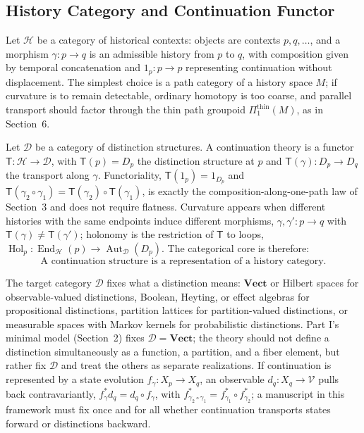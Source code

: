 \documentclass[11pt]{article}
\newcommand{\Hol}{\operatorname{Hol}}
\begin{document}
\subsection{History Category and Continuation Functor}

Let $\mathcal{H}$ be a category of historical contexts: objects are contexts $p, q, \ldots$, and a morphism $\gamma : p \to q$ is an admissible history from $p$ to $q$, with composition given by temporal concatenation and $1_p : p \to p$ representing continuation without displacement. The simplest choice is a path category of a history space $M$; if curvature is to remain detectable, ordinary homotopy is too coarse, and parallel transport should factor through the thin path groupoid $\Pi_1^{\mathrm{thin}}(M)$, as in Section~6.

Let $\mathcal{D}$ be a category of distinction structures. A continuation theory is a functor $\mathsf{T} : \mathcal{H} \to \mathcal{D}$, with $\mathsf{T}(p) = D_p$ the distinction structure at $p$ and $\mathsf{T}(\gamma) : D_p \to D_q$ the transport along $\gamma$. Functoriality, $\mathsf{T}(1_p) = 1_{D_p}$ and $\mathsf{T}(\gamma_2 \circ \gamma_1) = \mathsf{T}(\gamma_2) \circ \mathsf{T}(\gamma_1)$, is exactly the composition-along-one-path law of Section~3 and does not require flatness. Curvature appears when different histories with the same endpoints induce different morphisms, $\gamma, \gamma' : p \to q$ with $\mathsf{T}(\gamma) \neq \mathsf{T}(\gamma')$; holonomy is the restriction of $\mathsf{T}$ to loops, $\Hol_p : \operatorname{End}_{\mathcal{H}}(p) \to \operatorname{Aut}_{\mathcal{D}}(D_p)$. The categorical core is therefore:
\[
\text{A continuation structure is a representation of a history category.}
\]

The target category $\mathcal{D}$ fixes what a distinction means: $\mathbf{Vect}$ or Hilbert spaces for observable-valued distinctions, Boolean, Heyting, or effect algebras for propositional distinctions, partition lattices for partition-valued distinctions, or measurable spaces with Markov kernels for probabilistic distinctions. Part I's minimal model (Section~2) fixes $\mathcal{D} = \mathbf{Vect}$; the theory should not define a distinction simultaneously as a function, a partition, and a fiber element, but rather fix $\mathcal{D}$ and treat the others as separate realizations. If continuation is represented by a state evolution $f_\gamma : X_p \to X_q$, an observable $d_q : X_q \to \mathcal{V}$ pulls back contravariantly, $f_\gamma^\ast d_q = d_q \circ f_\gamma$, with $f_{\gamma_2 \circ \gamma_1}^\ast = f_{\gamma_1}^\ast \circ f_{\gamma_2}^\ast$; a manuscript in this framework must fix once and for all whether continuation transports states forward or distinctions backward.
\end{document}
